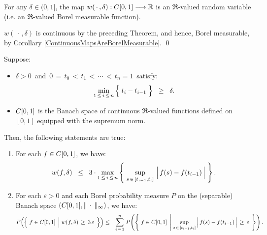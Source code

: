 \begin{corollary}
\mbox{}\vskip 0.1cm
\noindent
For any $\delta \in (0,1]$,
the map
$w(\,\cdot\,,\delta) : C[0,1] \longrightarrow \mathbb{R}$
is an $\Re$-valued random variable (i.e. an $\Re$-valued Borel measurable function).
\end{corollary}
\proof
$w(\,\cdot\,,\delta)$ is continuous by the preceding Theorem, and hence,
Borel measurable, by Corollary \ref{ContinuousMapsAreBorelMeasurable}.
\qed

\begin{proposition}
\mbox{}\vskip 0.2cm
\noindent
Suppose:
\begin{itemize}
\item	$\delta > 0$\, and \,$0 \,=\, t_{0} \,<\, t_{1} \,<\, \cdots \,<\, t_{n} = 1$\, satisfy:
		\begin{equation*}
		\min_{1\,\leq\,i\,\leq\,n}\left\{\;\overset{{\color{white}.}}{t}_{i} - t_{i-1}\;\right\}
		\;\; \geq \;\; \delta.
		\end{equation*}
\item	$C[0,1]$ is the Banach space of continuous $\Re$-valued functions defined on $[0,1]$
		equipped with the supremum norm.
\end{itemize}
Then, the following statements are true:
\begin{enumerate}
\item	For each $f \in C[0,1]$, we have:
		\begin{equation*}
		w(f,\delta) \;\; \leq \;\; 3 \cdot
			\max_{1\,\leq\,i\,\leq\,n}\left\{\;
				\sup_{s\,\in\,[t_{i-1},t_{i}]}\,\left\vert\,\overset{{\color{white}.}}{f}(s) - f(t_{i-1})\,\right\vert
			\;\right\}.
		\end{equation*}
\item	For each $\varepsilon > 0$ and each Borel probability measure $P$ on
		the (separable) Banach space $\left(C[0,1],\Vert\,\cdot\,\Vert_{\infty}\right)$,
		we have:
		\begin{eqnarray*}
		P\!\left(\left\{\;f\in\Czo\;\left\vert\;\overset{{\color{white}1}}{w}(f,\delta)\,\geq\,3\,\varepsilon\right.\;\right\}\right)
		&\leq& \overset{n}{\underset{i\,=\,1}{\sum}}\;
			P\!\left(\left\{\; f\in\Czo \;\left\vert\;
				\underset{s\,\in\,[t_{i-1},t_{i}]}{\sup}
				\left\vert\,f(s) \overset{{\color{white}.}}{-} f(t_{i-1})\,\right\vert\,\geq\,\varepsilon
				\right.\;\right\}\right).
		\end{eqnarray*}
\end{enumerate}
\end{proposition}
